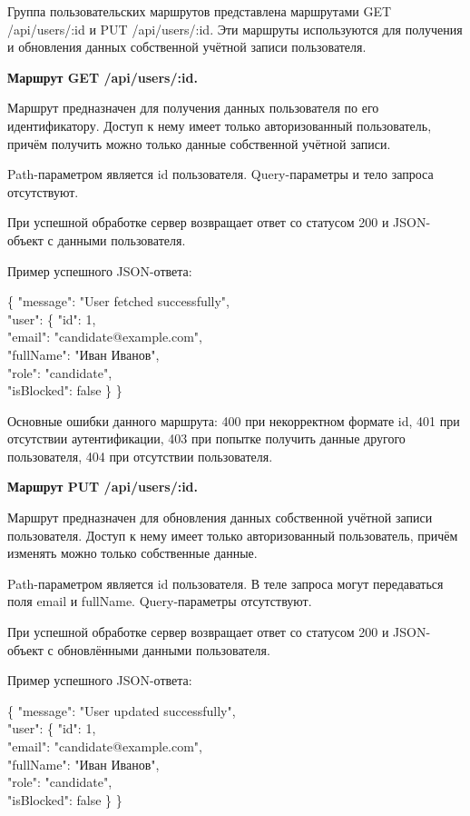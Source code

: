 Группа пользовательских маршрутов представлена маршрутами GET /api/users/:id и PUT /api/users/:id. Эти маршруты используются для получения и обновления данных собственной учётной записи пользователя.

\textbf{Маршрут GET /api/users/:id.}

Маршрут предназначен для получения данных пользователя по его идентификатору. Доступ к нему имеет только авторизованный пользователь, причём получить можно только данные собственной учётной записи.

Path-параметром является id пользователя. Query-параметры и тело запроса отсутствуют.

При успешной обработке сервер возвращает ответ со статусом 200 и JSON-объект с данными пользователя.

Пример успешного JSON-ответа:

\begin{flushleft}
	\small\ttfamily
	\{ "message": "User fetched successfully",\\
	"user": \{ "id": 1,\\
	"email": "candidate@example.com",\\
	"fullName": "Иван Иванов",\\
	"role": "candidate",\\
	"isBlocked": false \} \}
\end{flushleft}

Основные ошибки данного маршрута: 400 при некорректном формате id, 401 при отсутствии аутентификации, 403 при попытке получить данные другого пользователя, 404 при отсутствии пользователя.

\textbf{Маршрут PUT /api/users/:id.}

Маршрут предназначен для обновления данных собственной учётной записи пользователя. Доступ к нему имеет только авторизованный пользователь, причём изменять можно только собственные данные.

Path-параметром является id пользователя. В теле запроса могут передаваться поля email и fullName. Query-параметры отсутствуют.

При успешной обработке сервер возвращает ответ со статусом 200 и JSON-объект с обновлёнными данными пользователя.

Пример успешного JSON-ответа:

\begin{flushleft}
	\small\ttfamily
	\{ "message": "User updated successfully",\\
	"user": \{ "id": 1,\\
	"email": "candidate@example.com",\\
	"fullName": "Иван Иванов",\\
	"role": "candidate",\\
	"isBlocked": false \} \}
\end{flushleft}


